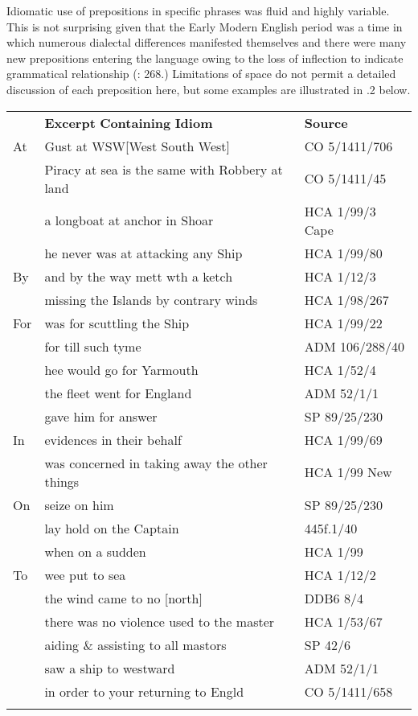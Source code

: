   Idiomatic use of prepositions in specific phrases was fluid and highly variable. This is not surprising given that the Early Modern English period was a time in which numerous dialectal differences manifested themselves and there were many new prepositions entering the language owing to the loss of inflection to indicate grammatical relationship (\citealt{MillwardHayes2012}: 268.) Limitations of space do not permit a detailed discussion of each preposition here, but some examples are illustrated in .2 below. 

\begin{tabularx}{\textwidth}{XXX}
\lsptoprule

\multicolumn{1}{X}{\textbf{Preposition}} & \textbf{Excerpt} \textbf{Containing} \textbf{Idiom} & \textbf{Source}\\
\multicolumn{1}{X}{At} & Gust at WSW[West South West] & CO 5/1411/706\\
& Piracy at sea is the same with Robbery at land & CO 5/1411/45\\
 & a longboat at anchor in Shoar & HCA 1/99/3 Cape \citealt{Coast1734}\\
 & he never was at attacking any Ship & HCA 1/99/80 \\
\multicolumn{1}{X}{By} & and by the way mett wth a ketch\footnotemark{} & HCA 1/12/3\\
& missing the Islands by contrary winds & HCA 1/98/267\\
\multicolumn{1}{X}{For} & was for scuttling the Ship & HCA 1/99/22\\
& for till such tyme & ADM 106/288/40\\
 & hee would go for Yarmouth & HCA 1/52/4\\
 & the fleet went for England & ADM 52/1/1\\
 & gave him for answer & SP 89/25/230\\
\multicolumn{1}{X}{In} & evidences in their behalf & HCA 1/99/69\\
& was concerned in taking away the other things & HCA 1/99 New \citealt{Providence1722}\\
\multicolumn{1}{X}{On} & seize on him & SP 89/25/230\\
& lay hold on the Captain & 445f.1/40\\
 & when on a sudden & HCA 1/99 \citealt{Barbados1733}\\
\multicolumn{1}{X}{To} & wee put to sea\footnotemark{} & HCA 1/12/2 \\
& the wind came to no [north] & DDB6 8/4\\
 & there was no violence used to the master & HCA 1/53/67\\
 & aiding \& assisting to all mastors & SP 42/6\\
 & saw a ship to westward & ADM 52/1/1\\
 & in order to your returning to Engld & CO 5/1411/658\\

\lspbottomrule
\end{tabularx}
